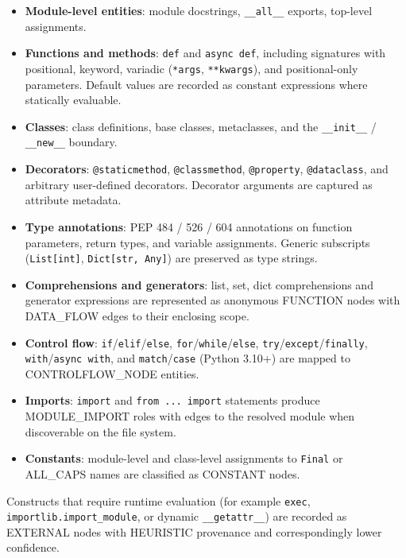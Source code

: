 \documentclass[
]{article}
\providecommand{\tightlist}{%
  \setlength{\itemsep}{0pt}\setlength{\parskip}{0pt}}
\begin{document}
\begin{itemize}
\tightlist
\item
  \textbf{Module-level entities}: module docstrings,
  \texttt{\_\_all\_\_} exports, top-level assignments.
\item
  \textbf{Functions and methods}: \texttt{def} and \texttt{async\ def},
  including signatures with positional, keyword, variadic
  (\texttt{*args}, \texttt{**kwargs}), and positional-only parameters.
  Default values are recorded as constant expressions where statically
  evaluable.
\item
  \textbf{Classes}: class definitions, base classes, metaclasses, and
  the \texttt{\_\_init\_\_} / \texttt{\_\_new\_\_} boundary.
\item
  \textbf{Decorators}: \texttt{@staticmethod}, \texttt{@classmethod},
  \texttt{@property}, \texttt{@dataclass}, and arbitrary user-defined
  decorators. Decorator arguments are captured as attribute metadata.
\item
  \textbf{Type annotations}: PEP 484 / 526 / 604 annotations on function
  parameters, return types, and variable assignments. Generic subscripts
  (\texttt{List{[}int{]}}, \texttt{Dict{[}str,\ Any{]}}) are preserved
  as type strings.
\item
  \textbf{Comprehensions and generators}: list, set, dict comprehensions
  and generator expressions are represented as anonymous FUNCTION nodes
  with DATA\_FLOW edges to their enclosing scope.
\item
  \textbf{Control flow}: \texttt{if}/\texttt{elif}/\texttt{else},
  \texttt{for}/\texttt{while}/\texttt{else},
  \texttt{try}/\texttt{except}/\texttt{finally},
  \texttt{with}/\texttt{async\ with}, and \texttt{match}/\texttt{case}
  (Python 3.10+) are mapped to CONTROLFLOW\_NODE entities.
\item
  \textbf{Imports}: \texttt{import} and \texttt{from\ ...\ import}
  statements produce MODULE\_IMPORT roles with edges to the resolved
  module when discoverable on the file system.
\item
  \textbf{Constants}: module-level and class-level assignments to
  \texttt{Final} or ALL\_CAPS names are classified as CONSTANT nodes.
\end{itemize}

Constructs that require runtime evaluation (for example \texttt{exec},
\texttt{importlib.import\_module}, or dynamic \texttt{\_\_getattr\_\_})
are recorded as EXTERNAL nodes with HEURISTIC provenance and
correspondingly lower confidence.
\end{document}
